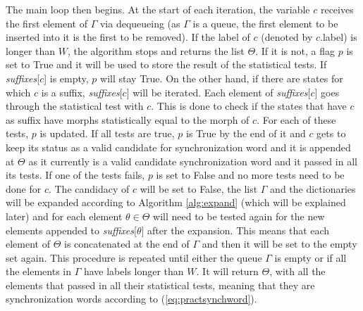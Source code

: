 {The main loop then begins. At the start of each iteration, the variable $c$ receives the first element of $\Gamma$ via dequeueing (as $\Gamma$ is a queue, the first element to be inserted into it is the first to be removed). If the label of $c$ (denoted by $c$.label) is longer than $W$, the algorithm stops and returns the list $\Theta$. If it is not, a flag $p$ is set to True and it will be used to store the result of the statistical tests. If \textit{suffixes}[$c$] is empty, $p$ will stay True. On the other hand, if there are states for which $c$ is a suffix, \textit{suffixes}[$c$] will be iterated. Each element of \textit{suffixes}[$c$] goes through the statistical test with $c$. This is done to check if the states that have $c$ as suffix have morphs statistically equal to the morph of $c$. For each of these tests, $p$ is updated. If all tests are true, $p$ is True by the end of it and $c$ gets to keep its status as a valid candidate for synchronization word and it is appended at $\Theta$ as it currently is a valid candidate synchronization word and it passed in all its tests. If one of the tests fails, $p$ is set to False and no more tests need to be done for $c$. The candidacy of $c$ will be set to False, the list $\Gamma$ and the dictionaries will be expanded according to Algorithm \ref{alg:expand} (which will be explained later) and for each element $\theta \in \Theta$ will need to be tested again for the new elements appended to \textit{suffixes}[$\theta$] after the expansion. This means that each element of $\Theta$ is concatenated at the end of $\Gamma$ and then it will be set to the empty set again. This procedure is repeated until either the queue $\Gamma$ is empty or if all the elements in $\Gamma$ have labels longer than $W$. It will return $\Theta$, with all the elements that passed in all their statistical tests, meaning that they are synchronization words according to (\ref{eq:practsynchword}). 

}
